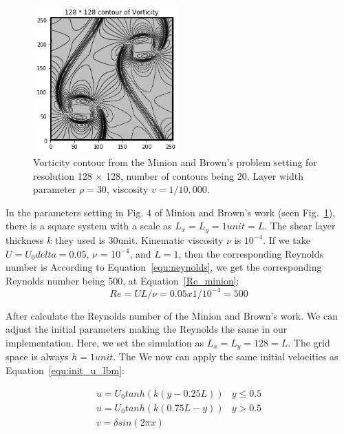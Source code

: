 \begin{figure}[!tb]
   \centering
       \includegraphics[width=0.5\textwidth]{figures/Voriticity_contour_128_128_c.png}
       \caption{Vorticity contour from the Minion and Brown's problem\cite{minion1997performance} setting  for resolution 128 $\times$ 128, number of contours being 20. Layer width parameter $\rho = 30$, viscosity $v=1/10,000$. }
       \label{fig:minion}
\end{figure}
In the parameters setting in Fig. 4 of Minion and Brown's work (seen Fig.~\ref{fig:minion}), there is a square system with a scale as $L_x = L_y = 1 unit = L$. The shear layer thickness $k$ they used is 30unit. Kinematic viscosity $\nu$ is $10^{-4}$. If we take $U = U_0 delta = 0.05$, $\nu$ = $10^{-4}$, and $L = 1$, then the corresponding Reynolds number is According to Equation~\ref{equ:neynolds}, we get the corresponding Reynolds number being 500, at Equation~\ref{Re_minion}:
\begin{equation}
\label{Re_minion}
    Re = UL / \nu = 0.05 x 1 / 10^{-4} = 500
\end{equation}

After calculate the Reynolds number of the Minion and Brown's work. We can adjust the initial parameters making the Reynolds the same in our implementation. Here, we set the simulation as $L_x = L_y = 128 = L$. The grid space is always $h = 1 unit$. The We now can apply the same initial velocities as Equation~\ref{equ:init_u_lbm}:

\begin{equation}
\label{equ:init_u_lbm}
    \begin{matrix}
u = U_0tanh(k (y-0.25L)) & y \leqslant 0.5 \\ 
u = U_0tanh(k (0.75L-y)) & y > 0.5  \\
v = \delta sin(2\pi x )
\end{matrix}
\end{equation}

